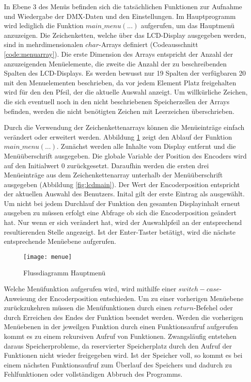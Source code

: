 In Ebene 3 des Menüs befinden sich die tatsächlichen Funktionen zur Aufnahme und Wiedergabe der DMX-Daten und den Einstellungen. Im Hauptprogramm wird lediglich die Funktion $main\_menu(...)$ aufgerufen, um das Hauptmenü anzuzeigen. Die Zeichenketten, welche über das LCD-Display ausgegeben werden, sind in mehrdimensionalen $char$-Arrays definiert (Codeausschnitt \ref{code:menuarray}). Die erste Dimension des Arrays entspricht der Anzahl der anzuzeigenden Menüelemente, die zweite die Anzahl der zu beschreibenden Spalten des LCD-Displays. Es werden bewusst nur 19 Spalten der verfügbaren 20 mit den Menuelementen beschrieben, da vor jedem Element Platz freigehalten wird für den den Pfeil, der die aktuelle Auswahl anzeigt. Um willkürliche Zeichen, die sich eventuell noch in den nicht beschriebenen Speicherzellen der Arrays befinden, werden die nicht benötigten Zeichen mit Leerzeichen überschrieben.

Durch die Verwendung der Zeichenkettenarrays können die Menüeinträge einfach verändert oder erweitert werden. Abbildung \ref{fig:flusshauptmenu} zeigt den Ablauf der Funktion $main\_menu(...)$. Zunächst werden alle Inhalte vom Display entfernt und die Menüüberschrift ausgegeben. Die globale Variable der Position des Encoders wird auf den Initialwert 0 zurückgesetzt. Daraufhin werden die ersten drei Menüeinträge aus dem Zeichenkettenarray unterhalb der Menüüberschrift ausgegeben (Abbildung \ref{fig:lcdmain}). Der Wert der Encoderposition entspricht der aktuellen Auswahl des Benutzers. Inital gilt der erste Eintrag als ausgewählt. Um nicht bei jedem Durchlauf der Funktion den gesamten Displayinhalt erneut ausgeben zu müssen erfolgt eine Abfrage ob sich die Encoderposition geändert hat. Nur wenn er sich verändert hat, wird der Auswahlpfeil an der entsprechend resultierenden Stelle angezeigt. Ist der Enter-Taster betätigt, wird die nächste entsprechende Menüebene aufgerufen.
\begin{figure}[h]
	\centering
	\texttt{[image: menue]}
	\caption{Flussdiagramm Hauptmenü}
	\label{fig:flusshauptmenu}
\end{figure}
Welche Menüfunktion aufgerufen wird, wird mithilfe einer $switch-case$-Anweisung der Encoderposition entschieden. 
\newline
Um zu einer vorherigen Menüebene zurückzukehren müssen die Menüfunktionen durch einen $return$-Befehel oder durch Erreichen des Endes der Funktion beendet werden. Werden die vorherigen Menüebenen in der jeweilgen Funktion durch einen Funktionsaufruf aufgerufen kommt es zu einem rekursiven Aufruf von Funktionen. Zwangsläufig entstehen daraus Speicherprobleme, da reservierter Speicherplatz durch den Aufruf der Funktionen nicht wieder freigegeben wird. Ist der Speicher voll, so kommt es bei einem nächsten Funktionsaufruf zum Überlauf des Speichers und dadurch zu Fehlfunktionen oder vollständigen Abbruch des Programms.